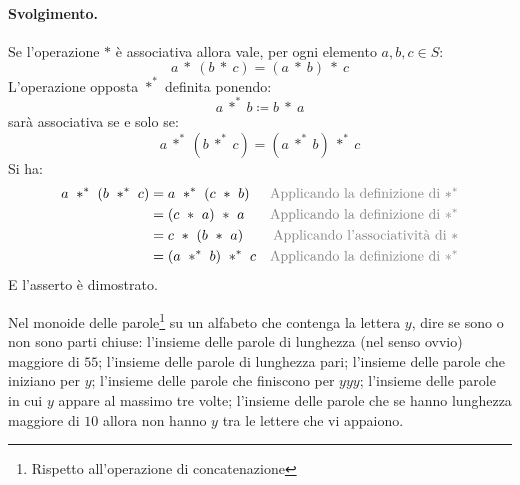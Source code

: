 \paragraph*{Svolgimento.} Se l'operazione $\ast$ è associativa allora vale, per ogni elemento $a,b,c \in S$:
\begin{displaymath}
	a \ \ast \ (b \ \ast \ c) = (a \ \ast \ b) \ \ast \ c
\end{displaymath}
L'operazione opposta $\ast^{\ast}$ definita ponendo:
\begin{displaymath}
	a \ \ast^{\ast} \ b \coloneqq b \ \ast \ a
\end{displaymath}
sarà associativa se e solo se:
\begin{displaymath}
	a \ \ast^{\ast} \ (b \ \ast^{\ast} \ c) = (a \ \ast^{\ast} \ b) \ \ast^{\ast} \ c
\end{displaymath}
Si ha:
\begin{align*}
	a \ \ast^{\ast} \ (b \ \ast^{\ast} \ c) &= a \ \ast^{\ast} \ (c \ \ast \ b) & \text{\textcolor{gray}{Applicando la definizione di $\ast^{\ast}$}} \\
	&= (c \ \ast \ a) \ \ast \ a & \text{\textcolor{gray}{Applicando la definizione di $\ast^{\ast}$}} \\
	&= c \ \ast \ (b \ \ast \ a) & \text{\textcolor{gray}{Applicando l'associatività di $\ast$}} \\
	&= (a \ \ast^{\ast} \ b ) \ \ast^{\ast} \ c  & \text{\textcolor{gray}{Applicando la definizione di $\ast^{\ast}$}}
\end{align*}
E l'asserto è dimostrato. \hfill \blacksquare
\begin{exsbox}
	Nel monoide delle parole\footnote{Rispetto all'operazione di concatenazione} su un alfabeto che contenga la lettera $y$, dire se sono o non sono parti chiuse: l'insieme delle parole di lunghezza (nel senso ovvio) maggiore di $55$; l'insieme delle parole di lunghezza pari; l'insieme delle parole che iniziano per $y$; l'insieme delle parole che finiscono per $yyy$; l'insieme delle parole in cui $y$ appare al massimo tre volte; l'insieme delle parole che se hanno lunghezza maggiore di $10$ allora non hanno $y$ tra le lettere che vi appaiono.
\end{exsbox}
